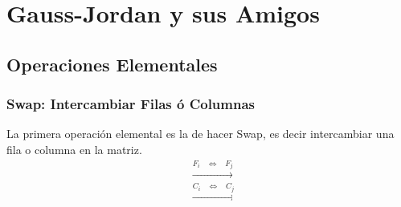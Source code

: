 \documentclass[12pt, fleqn]{report}                             %
\DeclareMathOperator \Space {\quad}                             %
\DeclareMathOperator \MiniSpace {\;}                            %
\theoremstyle{break}                                            %
\newcommand \lEqual  {\MiniSpace \Leftrightarrow \MiniSpace}    %
\newcommand \lLongTo {\longrightarrow}                          %
\begin{document}
    \chapter{Gauss-Jordan y sus Amigos}



        \clearpage
        \section{Operaciones Elementales}


            \subsection{Swap: Intercambiar Filas ó Columnas}

                La primera operación elemental es la de hacer Swap, es decir intercambiar una
                fila o columna en la matriz.
                \begin{align*}
                    &\overset{F_i \lEqual F_j}{\lLongTo}     \\
                    &\overset{C_i \lEqual C_j}{\lLongTo}
                \end{align*}
\end{document}
